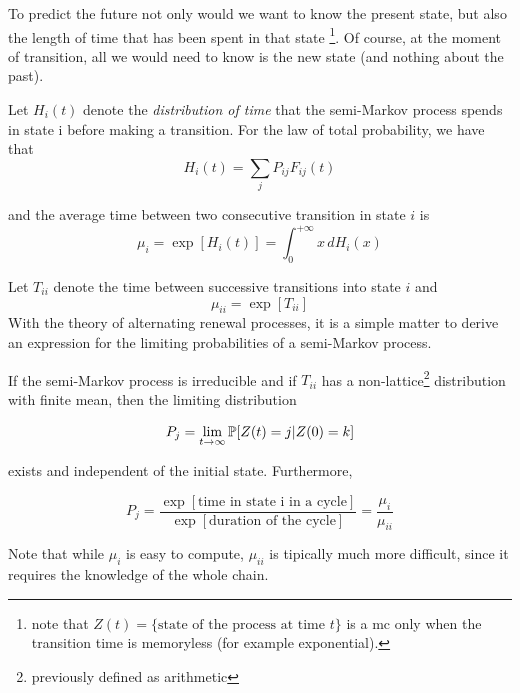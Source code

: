 To predict the future not only would we want to know the present state, but also the length of time that has been spent in that state
\footnote{note that $Z(t) = \{\text{state of the process at time } t\}$ is a \gls{mc} only when the transition time is memoryless (for example exponential).}. Of course, at the moment of transition, all we would need to know is the new state (and nothing about the past).

Let $H_i(t)$ denote the \emph{distribution of time} that the semi-Markov process spends in state i before making a transition. For the law of total probability, we have that
\begin{equation}
	H_i(t) = \sum_j P_{ij} F_{ij}(t)
\end{equation}

and the average time between two consecutive transition in state $i$ is
\begin{equation}
	 \mu_i = \exp[H_i(t)] = \int_{0}^{+\infty}x \,dH_i(x)
\end{equation}

Let $T_{ii}$ denote the time between successive transitions into state $i$ and
\begin{equation}
\mu_{ii}=\exp [T_{ii}]
\end{equation}
With the theory of alternating renewal processes, it is a simple matter to derive an expression for the limiting probabilities of a semi-Markov process.

\begin{theorem}
	If the semi-Markov process is irreducible and if $T_{ii}$ has a non-lattice\footnote{previously defined as arithmetic} distribution with finite mean, then the limiting distribution

	$$P_j = \lim_{t \to \infty} \mathbb{P}[Z(t)=j | Z(0)=k]$$

	exists and independent of the initial state. Furthermore,

	$$P_j = \frac{\exp[\mbox{time in state i in a cycle}]}{\exp[\mbox{duration of the cycle}]} = \frac{\mu_i}{\mu_{ii}}$$

\end{theorem}
Note that while $\mu_i$ is easy to compute, $\mu_{ii}$ is tipically much more difficult, since it requires the knowledge of the whole chain.

